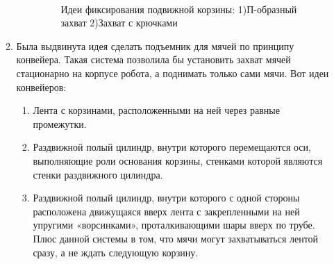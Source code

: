 \begin{enumerate}
\begin{enumerate}
\begin{enumerate}
			\begin{figure}[H]
				\begin{minipage}[h]{0.2\linewidth}
					\center  
				\end{minipage}
				\begin{minipage}[h]{0.6\linewidth}
					\caption{Идеи фиксирования подвижной корзины: 1)П-образный захват 2)Захват с крючками}
				\end{minipage}
			\end{figure}
			
		\end{enumerate}
		
		\item Была выдвинута идея сделать подъемник для мячей по принципу конвейера. Такая система позволила бы установить захват мячей стационарно на корпусе робота, а поднимать только сами мячи. Вот идеи конвейеров:
		\begin{enumerate}
			\item Лента с корзинами, расположенными на ней через равные промежутки.
			
			\item Раздвижной полый цилиндр, внутри которого перемещаются оси, выполняющие роли основания корзины, стенками которой являются стенки раздвижного цилиндра.
			
			\item Раздвижной полый цилиндр, внутри которого с одной стороны расположена движущаяся вверх лента с закрепленными на ней упругими «ворсинками», проталкивающими шары вверх по трубе. Плюс данной системы в том, что мячи могут захватываться лентой сразу, а не ждать следующую корзину.
			

\end{enumerate}
\end{enumerate}
\end{enumerate}
